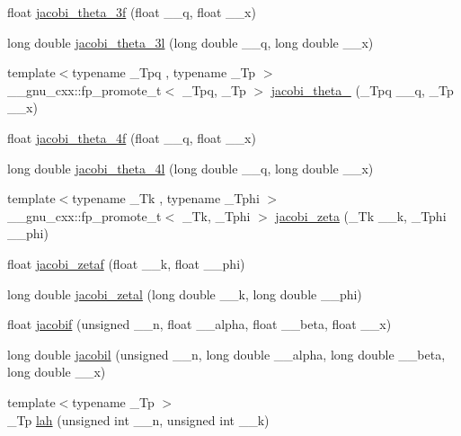 \begin{DoxyCompactItemize}
\item 
float \hyperlink{group__mathsf__gnu_ga6ff9738978be029e90e1f144ab4aa165}{jacobi\+\_\+theta\+\_\+3f} (float \+\_\+\+\_\+q, float \+\_\+\+\_\+x)
\item 
long double \hyperlink{group__mathsf__gnu_ga313109bbf08d81e93196eb73c2047dd2}{jacobi\+\_\+theta\+\_\+3l} (long double \+\_\+\+\_\+q, long double \+\_\+\+\_\+x)
\item 
{\footnotesize template$<$typename \+\_\+\+Tpq , typename \+\_\+\+Tp $>$ }\\\+\_\+\+\_\+gnu\+\_\+cxx\+::fp\+\_\+promote\+\_\+t$<$ \+\_\+\+Tpq, \+\_\+\+Tp $>$ \hyperlink{group__mathsf__gnu_ga676501b6284d5702a3dc61252e6c78ab}{jacobi\+\_\+theta\+\_} (\+\_\+\+Tpq \+\_\+\+\_\+q, \+\_\+\+Tp \+\_\+\+\_\+x)
\item 
float \hyperlink{group__mathsf__gnu_ga57dcc5ae4b1a3d1e38adccad85204bca}{jacobi\+\_\+theta\+\_\+4f} (float \+\_\+\+\_\+q, float \+\_\+\+\_\+x)
\item 
long double \hyperlink{group__mathsf__gnu_ga7c2a13198bdfd3f8cf1bc1758b1f56be}{jacobi\+\_\+theta\+\_\+4l} (long double \+\_\+\+\_\+q, long double \+\_\+\+\_\+x)
\item 
{\footnotesize template$<$typename \+\_\+\+Tk , typename \+\_\+\+Tphi $>$ }\\\+\_\+\+\_\+gnu\+\_\+cxx\+::fp\+\_\+promote\+\_\+t$<$ \+\_\+\+Tk, \+\_\+\+Tphi $>$ \hyperlink{group__mathsf__gnu_ga639be4ebef9a20572375ec534be52b07}{jacobi\+\_\+zeta} (\+\_\+\+Tk \+\_\+\+\_\+k, \+\_\+\+Tphi \+\_\+\+\_\+phi)
\item 
float \hyperlink{group__mathsf__gnu_gaedb6b352331c67b9dea73660e2045668}{jacobi\+\_\+zetaf} (float \+\_\+\+\_\+k, float \+\_\+\+\_\+phi)
\item 
long double \hyperlink{group__mathsf__gnu_ga9db158df9459aa12c840724338753913}{jacobi\+\_\+zetal} (long double \+\_\+\+\_\+k, long double \+\_\+\+\_\+phi)
\item 
float \hyperlink{group__mathsf__gnu_ga450db12e06d6993d169afab5b3f6d0b8}{jacobif} (unsigned \+\_\+\+\_\+n, float \+\_\+\+\_\+alpha, float \+\_\+\+\_\+beta, float \+\_\+\+\_\+x)
\item 
long double \hyperlink{group__mathsf__gnu_ga2898a5ebf451eaf259ecfcdd171aa72b}{jacobil} (unsigned \+\_\+\+\_\+n, long double \+\_\+\+\_\+alpha, long double \+\_\+\+\_\+beta, long double \+\_\+\+\_\+x)
\item 
{\footnotesize template$<$typename \+\_\+\+Tp $>$ }\\\+\_\+\+Tp \hyperlink{group__mathsf__gnu_gaa3491fabb0a6ef54a946a7a23ca866c7}{lah} (unsigned int \+\_\+\+\_\+n, unsigned int \+\_\+\+\_\+k)

\end{DoxyCompactItemize}
